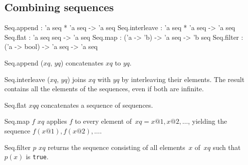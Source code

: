 \subsection{Combining sequences}
\begin{ttbox} 
Seq.append      : 'a seq * 'a seq -> 'a seq
Seq.interleave  : 'a seq * 'a seq -> 'a seq
Seq.flat        : 'a seq seq -> 'a seq
Seq.map         : ('a -> 'b) -> 'a seq -> 'b seq
Seq.filter      : ('a -> bool) -> 'a seq -> 'a seq
\end{ttbox} 
\begin{ttdescription}
\item[Seq.append ($xq$, $yq$)] concatenates $xq$ to $yq$.
  
\item[Seq.interleave ($xq$, $yq$)] joins $xq$ with $yq$ by
  interleaving their elements.  The result contains all the elements
  of the sequences, even if both are infinite.
  
\item[Seq.flat $xqq$] concatenates a sequence of sequences.
  
\item[Seq.map $f$ $xq$] applies $f$ to every element
  of~$xq=x@1,x@2,\ldots$, yielding the sequence $f(x@1),f(x@2),\ldots$.
  
\item[Seq.filter $p$ $xq$] returns the sequence consisting of all
  elements~$x$ of~$xq$ such that $p(x)$ is {\tt true}.
\end{ttdescription}




